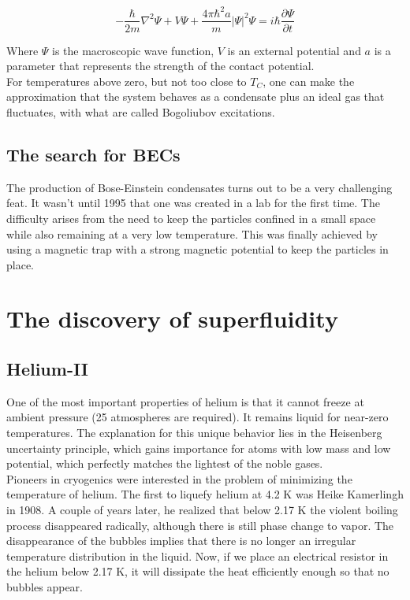 \documentclass{article}
\begin{document}
\[-\frac{\hbar}{2m}\nabla^2\Psi+V\Psi+\frac{4\pi\hbar^2a}{m}|\Psi|^2\Psi=i\hbar \frac{\partial \Psi}{\partial t}\]

Where $\Psi$ is the macroscopic wave function, $V$ is an external potential and $a$ is a parameter that represents the strength of the contact potential.
\\

For temperatures above zero, but not too close to $T_C$, one can make the approximation that the system behaves as a condensate plus an ideal gas that fluctuates, with what are called Bogoliubov excitations.
\subsection{The search for BECs}

The production of Bose-Einstein condensates turns out to be a very challenging feat.  It wasn't until 1995 that one was created in a lab for the first time.  The difficulty arises from the need to keep the particles confined in a small space while also remaining at a very low temperature.  This was finally achieved by using a magnetic trap with a strong magnetic potential to keep the particles in place.

\section{The discovery of superfluidity}

\subsection{Helium-II}
One of the most important properties of helium is that it cannot freeze at ambient pressure (25 atmospheres are required). It remains liquid for near-zero temperatures. The explanation for this unique behavior lies in the Heisenberg uncertainty principle, which gains importance for atoms with low mass and low potential, which perfectly matches the lightest of the noble gases.
\\

Pioneers in cryogenics were interested in the problem of minimizing the temperature of helium. The first to liquefy helium at 4.2 K was Heike Kamerlingh in 1908. A couple of years later, he realized that below 2.17 K the violent boiling process disappeared radically, although there is still phase change to vapor. The disappearance of the bubbles implies that there is no longer an irregular temperature distribution in the liquid. Now, if we place an electrical resistor in the helium below 2.17 K, it will dissipate the heat efficiently enough so that no bubbles appear. 
\\
\end{document}
